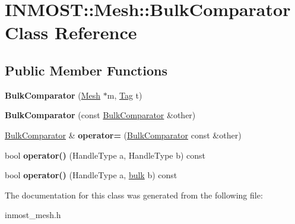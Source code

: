 \hypertarget{classINMOST_1_1Mesh_1_1BulkComparator}{\section{I\-N\-M\-O\-S\-T\-:\-:Mesh\-:\-:Bulk\-Comparator Class Reference}
\label{classINMOST_1_1Mesh_1_1BulkComparator}
}
\subsection*{Public Member Functions}
\begin{DoxyCompactItemize}
\item 
\hypertarget{classINMOST_1_1Mesh_1_1BulkComparator_afc7c8db127b3f4339adf7ef48d921923}{{\bfseries Bulk\-Comparator} (\hyperlink{classINMOST_1_1Mesh}{Mesh} $\ast$m, \hyperlink{classINMOST_1_1Tag}{Tag} t)}\label{classINMOST_1_1Mesh_1_1BulkComparator_afc7c8db127b3f4339adf7ef48d921923}

\item 
\hypertarget{classINMOST_1_1Mesh_1_1BulkComparator_a5e30b8afe1f6cccea77fae07026566db}{{\bfseries Bulk\-Comparator} (const \hyperlink{classINMOST_1_1Mesh_1_1BulkComparator}{Bulk\-Comparator} \&other)}\label{classINMOST_1_1Mesh_1_1BulkComparator_a5e30b8afe1f6cccea77fae07026566db}

\item 
\hypertarget{classINMOST_1_1Mesh_1_1BulkComparator_a179a1129355506893435dd45980ad85e}{\hyperlink{classINMOST_1_1Mesh_1_1BulkComparator}{Bulk\-Comparator} \& {\bfseries operator=} (\hyperlink{classINMOST_1_1Mesh_1_1BulkComparator}{Bulk\-Comparator} const \&other)}\label{classINMOST_1_1Mesh_1_1BulkComparator_a179a1129355506893435dd45980ad85e}

\item 
\hypertarget{classINMOST_1_1Mesh_1_1BulkComparator_a8bd2436e36d465c2f9c2984b55c83ccd}{bool {\bfseries operator()} (Handle\-Type a, Handle\-Type b) const }\label{classINMOST_1_1Mesh_1_1BulkComparator_a8bd2436e36d465c2f9c2984b55c83ccd}

\item 
\hypertarget{classINMOST_1_1Mesh_1_1BulkComparator_a6691985bca09a9ad66e3d6dc9fdd0068}{bool {\bfseries operator()} (Handle\-Type a, \hyperlink{classINMOST_1_1Storage_ae429556af77094077d212e0ac23c8cfc}{bulk} b) const }\label{classINMOST_1_1Mesh_1_1BulkComparator_a6691985bca09a9ad66e3d6dc9fdd0068}

\end{DoxyCompactItemize}


The documentation for this class was generated from the following file\-:\begin{DoxyCompactItemize}
\item 
inmost\-\_\-mesh.\-h\end{DoxyCompactItemize}
